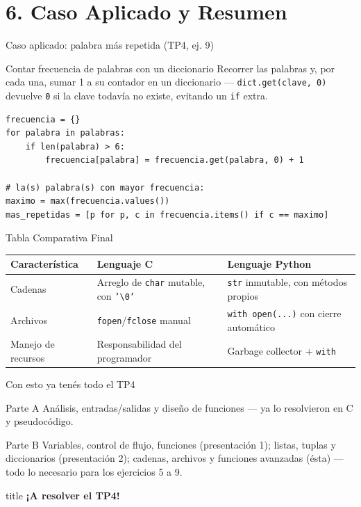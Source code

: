 \documentclass{beamer}
\begin{document}
\section{6. Caso Aplicado y Resumen}

\begin{frame}[fragile]{Caso aplicado: palabra más repetida (TP4, ej. 9)}
  \begin{block}{Contar frecuencia de palabras con un diccionario}
    Recorrer las palabras y, por cada una, sumar 1 a su contador en un
    diccionario — \texttt{dict.get(clave, 0)} devuelve \texttt{0} si la
    clave todavía no existe, evitando un \texttt{if} extra.
  \end{block}
  \begin{verbatim}
frecuencia = {}
for palabra in palabras:
    if len(palabra) > 6:
        frecuencia[palabra] = frecuencia.get(palabra, 0) + 1

# la(s) palabra(s) con mayor frecuencia:
maximo = max(frecuencia.values())
mas_repetidas = [p for p, c in frecuencia.items() if c == maximo]
  \end{verbatim}
\end{frame}

\begin{frame}{Tabla Comparativa Final}
  \begin{center}
  \renewcommand{\arraystretch}{1.3}
  \begin{tabular}{|l|p{4cm}|p{4cm}|}
    \hline
    \textbf{Característica} & \textbf{Lenguaje C} & \textbf{Lenguaje Python} \\
    \hline \hline
    Cadenas & Arreglo de \texttt{char} mutable, con \texttt{'\textbackslash0'} & \texttt{str} inmutable, con métodos propios \\
    \hline
    Archivos & \texttt{fopen}/\texttt{fclose} manual & \texttt{with open(...)} con cierre automático \\
    \hline
    Manejo de recursos & Responsabilidad del programador & Garbage collector + \texttt{with} \\
    \hline
  \end{tabular}
  \end{center}
\end{frame}

\begin{frame}{Con esto ya tenés todo el TP4}
  \begin{block}{Parte A}
    Análisis, entradas/salidas y diseño de funciones — ya lo resolvieron
    en C y pseudocódigo.
  \end{block}
  \begin{block}{Parte B}
    Variables, control de flujo, funciones (presentación 1); listas,
    tuplas y diccionarios (presentación 2); cadenas, archivos y funciones
    avanzadas (ésta) — todo lo necesario para los ejercicios 5 a 9.
  \end{block}
\end{frame}

\begin{frame}
  \vfill
  \centering
  \begin{beamercolorbox}[sep=8pt,center,shadow=true,rounded=true]{title}
    \Huge \bfseries ¡A resolver el TP4!
  \end{beamercolorbox}
  \vfill
\end{frame}
\end{document}
